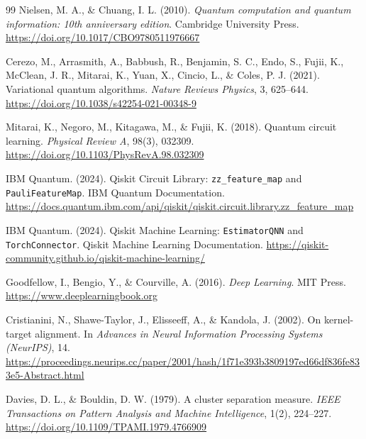 \begin{thebibliography}{99}
    Nielsen, M. A., \& Chuang, I. L. (2010). \textit{Quantum computation and quantum information: 10th anniversary edition}.
    Cambridge University Press. \url{https://doi.org/10.1017/CBO9780511976667}

    Cerezo, M., Arrasmith, A., Babbush, R., Benjamin, S. C., Endo, S., Fujii, K., McClean, J. R., Mitarai, K., Yuan, X., Cincio, L., \& Coles, P. J. (2021). Variational quantum algorithms. \textit{Nature Reviews Physics}, 3, 625--644. \url{https://doi.org/10.1038/s42254-021-00348-9}

    Mitarai, K., Negoro, M., Kitagawa, M., \& Fujii, K. (2018). Quantum circuit learning. \textit{Physical Review A}, 98(3), 032309. \url{https://doi.org/10.1103/PhysRevA.98.032309}

    IBM Quantum. (2024). Qiskit Circuit Library: \texttt{zz\_feature\_map} and \texttt{PauliFeatureMap}. IBM Quantum Documentation. \url{https://docs.quantum.ibm.com/api/qiskit/qiskit.circuit.library.zz_feature_map}

    IBM Quantum. (2024). Qiskit Machine Learning: \texttt{EstimatorQNN} and \texttt{TorchConnector}. Qiskit Machine Learning Documentation. \url{https://qiskit-community.github.io/qiskit-machine-learning/}

    Goodfellow, I., Bengio, Y., \& Courville, A. (2016). \textit{Deep Learning}. MIT Press.
    \url{https://www.deeplearningbook.org}

    Cristianini, N., Shawe-Taylor, J., Elisseeff, A., \& Kandola, J. (2002). On kernel-target alignment.
    In \textit{Advances in Neural Information Processing Systems (NeurIPS)}, 14.
    \url{https://proceedings.neurips.cc/paper/2001/hash/1f71e393b3809197ed66df836fe833e5-Abstract.html}

    Davies, D. L., \& Bouldin, D. W. (1979). A cluster separation measure.
    \textit{IEEE Transactions on Pattern Analysis and Machine Intelligence}, 1(2), 224--227.
    \url{https://doi.org/10.1109/TPAMI.1979.4766909}


\end{thebibliography}
